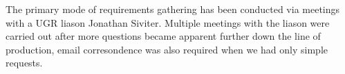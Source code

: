 The primary mode of requirements gathering has been conducted via meetings with a UGR liason Jonathan Siviter. Multiple meetings with the liason were carried out after more questions became apparent further down the line of production, email corresondence was also required when we had only simple requests. 